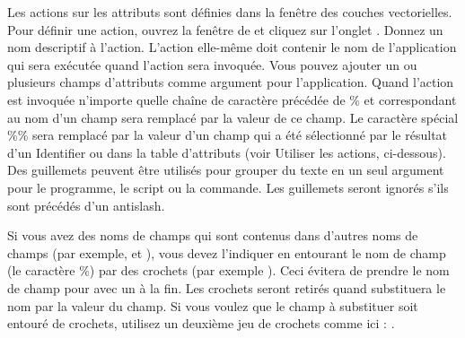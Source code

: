 Les actions sur les attributs sont définies dans la fenêtre  des couches vectorielles. Pour définir une action, ouvrez la fenêtre de  et cliquez sur l'onglet . Donnez un nom descriptif à l'action. L'action elle-même doit contenir le nom de l'application qui sera exécutée quand l'action sera invoquée. Vous pouvez ajouter un ou plusieurs champs d'attributs comme argument pour l'application. Quand l'action est invoquée n'importe quelle chaîne de caractère précédée de \% et correspondant au nom d'un champ sera remplacé par la valeur de ce champ. Le caractère spécial \%\% sera remplacé par la valeur d'un champ qui a été sélectionné par le résultat d'un Identifier ou dans la table d'attributs (voir Utiliser les actions, ci-dessous). Des guillemets peuvent être utilisés pour grouper du texte en un seul argument pour le programme, le script ou la commande. Les guillemets seront ignorés s'ils sont précédés d'un antislash.

Si vous avez des noms de champs qui sont contenus dans d'autres noms de champs (par exemple,  et ), vous devez l'indiquer en entourant le nom de champ (le caractère \%) par des crochets (par exemple \usertext{[\%col10]}). Ceci évitera de prendre le nom de champ  pour  avec un  à la fin. Les crochets seront retirés quand \qg substituera le nom par la valeur du champ. Si vous voulez que le champ à substituer soit entouré de crochets, utilisez un deuxième jeu de crochets comme ici : \usertext{[[\%col10]]}.

